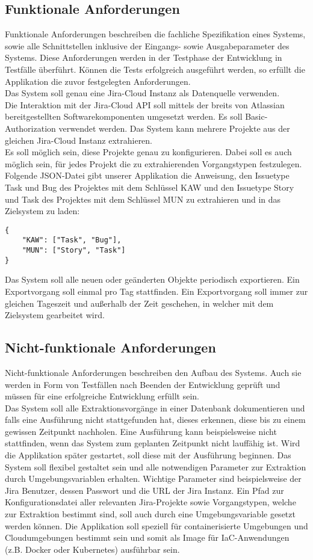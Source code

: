 \documentclass[10pt]{article}
\begin{document}
\subsection{Funktionale Anforderungen}
Funktionale Anforderungen beschreiben die fachliche Spezifikation eines Systems, sowie alle Schnittstellen inklusive der Eingangs- sowie Ausgabeparameter des Systems. Diese Anforderungen werden in der Testphase der Entwicklung in Testfälle überführt. Können die Tests erfolgreich ausgeführt werden, so erfüllt die Applikation die zuvor festgelegten Anforderungen.\\
Das System soll genau eine Jira-Cloud Instanz als Datenquelle verwenden. \\
Die Interaktion mit der Jira-Cloud API soll mittels der breits von Atlassian bereitgestellten Softwarekomponenten umgesetzt werden. Es soll Basic-Authorization verwendet werden.
Das System kann mehrere Projekte aus der gleichen Jira-Cloud Instanz extrahieren.\\ Es soll möglich sein, diese Projekte genau zu konfigurieren. Dabei soll es auch möglich sein, für jedes Projekt die zu extrahierenden Vorgangstypen festzulegen. Folgende JSON-Datei gibt unserer Applikation die Anweisung, den Issuetype Task und Bug des Projektes mit dem Schlüssel KAW und den Issuetype Story und Task des Projektes mit dem Schlüssel MUN zu extrahieren und in das Zielsystem zu laden:
\begin{lstlisting}
{
    "KAW": ["Task", "Bug"],
    "MUN": ["Story", "Task"]
}
\end{lstlisting}
Das System soll alle neuen oder geänderten Objekte periodisch exportieren. Ein Exportvorgang soll einmal pro Tag stattfinden. Ein Exportvorgang soll immer zur gleichen Tageszeit und außerhalb der Zeit geschehen, in welcher mit dem Zielsystem gearbeitet wird.

\subsection{Nicht-funktionale Anforderungen}
Nicht-funktionale Anforderungen beschreiben den Aufbau des Systems. Auch sie werden in Form von Testfällen nach Beenden der Entwicklung geprüft und müssen für eine erfolgreiche Entwicklung erfüllt sein.\\
Das System soll alle Extraktionsvorgänge in einer Datenbank dokumentieren und falls eine Ausführung nicht stattgefunden hat, dieses erkennen, diese bis zu einem gewissen Zeitpunkt nachholen. Eine Ausführung kann beispielsweise nicht stattfinden, wenn das System zum geplanten Zeitpunkt nicht lauffähig ist. Wird die Applikation später gestartet, soll diese mit der Ausführung beginnen.
Das System soll flexibel gestaltet sein und alle notwendigen Parameter zur Extraktion durch Umgebungsvariablen erhalten. Wichtige Parameter sind beispielsweise der Jira Benutzer, dessen Passwort und die URL der Jira Instanz. Ein Pfad zur Konfigurationsdatei aller relevanten Jira-Projekte sowie Vorgangstypen, welche zur Extraktion bestimmt sind, soll auch durch eine Umgebungsvariable gesetzt werden können.
Die Applikation soll speziell für containerisierte Umgebungen und Cloudumgebungen bestimmt sein und somit als Image für IaC-Anwendungen (z.B. Docker oder Kubernetes) ausführbar sein.
\end{document}
